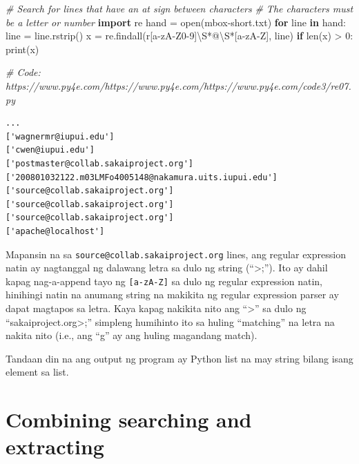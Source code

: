 \documentclass[10pt,]{book}
\newenvironment{Shaded}{}{}
\newcommand{\BuiltInTok}[1]{\textcolor[rgb]{0.00,0.50,0.00}{#1}}
\newcommand{\CommentTok}[1]{\textcolor[rgb]{0.38,0.63,0.69}{\textit{#1}}}
\newcommand{\ControlFlowTok}[1]{\textcolor[rgb]{0.00,0.44,0.13}{\textbf{#1}}}
\newcommand{\DecValTok}[1]{\textcolor[rgb]{0.25,0.63,0.44}{#1}}
\newcommand{\ImportTok}[1]{\textcolor[rgb]{0.00,0.50,0.00}{\textbf{#1}}}
\newcommand{\KeywordTok}[1]{\textcolor[rgb]{0.00,0.44,0.13}{\textbf{#1}}}
\newcommand{\NormalTok}[1]{#1}
\newcommand{\OperatorTok}[1]{\textcolor[rgb]{0.40,0.40,0.40}{#1}}
\newcommand{\PreprocessorTok}[1]{\textcolor[rgb]{0.74,0.48,0.00}{#1}}
\newcommand{\StringTok}[1]{\textcolor[rgb]{0.25,0.44,0.63}{#1}}
\newcommand{\VerbatimStringTok}[1]{\textcolor[rgb]{0.25,0.44,0.63}{#1}}
\begin{document}
\begin{Shaded}
\begin{Highlighting}[]
\CommentTok{\# Search for lines that have an at sign between characters}
\CommentTok{\# The characters must be a letter or number}
\ImportTok{import}\NormalTok{ re}
\NormalTok{hand }\OperatorTok{=} \BuiltInTok{open}\NormalTok{(}\StringTok{\textquotesingle{}mbox{-}short.txt\textquotesingle{}}\NormalTok{)}
\ControlFlowTok{for}\NormalTok{ line }\KeywordTok{in}\NormalTok{ hand:}
\NormalTok{    line }\OperatorTok{=}\NormalTok{ line.rstrip()}
\NormalTok{    x }\OperatorTok{=}\NormalTok{ re.findall(}\VerbatimStringTok{r\textquotesingle{}}\PreprocessorTok{[a{-}zA{-}Z0{-}9]}\DecValTok{\textbackslash{}S}\OperatorTok{*}\VerbatimStringTok{@}\DecValTok{\textbackslash{}S}\OperatorTok{*}\PreprocessorTok{[a{-}zA{-}Z]}\VerbatimStringTok{\textquotesingle{}}\NormalTok{, line)}
    \ControlFlowTok{if} \BuiltInTok{len}\NormalTok{(x) }\OperatorTok{\textgreater{}} \DecValTok{0}\NormalTok{:}
        \BuiltInTok{print}\NormalTok{(x)}

\CommentTok{\# Code: https://www.py4e.com/https://www.py4e.com/https://www.py4e.com/code3/re07.py}
\end{Highlighting}
\end{Shaded}


{\small
\begin{verbatim}
...
['wagnermr@iupui.edu']
['cwen@iupui.edu']
['postmaster@collab.sakaiproject.org']
['200801032122.m03LMFo4005148@nakamura.uits.iupui.edu']
['source@collab.sakaiproject.org']
['source@collab.sakaiproject.org']
['source@collab.sakaiproject.org']
['apache@localhost']
\end{verbatim}
}

Mapansin na sa \texttt{source@collab.sakaiproject.org} lines, ang
regular expression natin ay nagtanggal ng dalawang letra sa dulo ng
string (``\textgreater;''). Ito ay dahil kapag nag-a-append tayo ng
\texttt{{[}a-zA-Z{]}} sa dulo ng regular expression natin, hinihingi
natin na anumang string na makikita ng regular expression parser ay
dapat magtapos sa letra. Kaya kapag nakikita nito ang ``\textgreater{}''
sa dulo ng ``sakaiproject.org\textgreater;'' simpleng humihinto ito sa
huling ``matching'' na letra na nakita nito (i.e., ang ``g'' ay ang
huling magandang match).

Tandaan din na ang output ng program ay Python list na may string bilang
isang element sa list.

\section{Combining searching and
extracting}\label{combining-searching-and-extracting}
\end{document}
